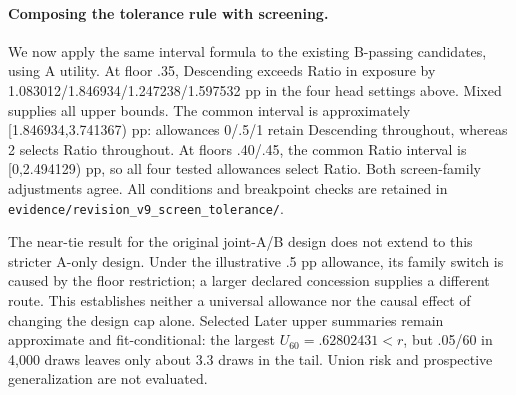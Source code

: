 

\paragraph{Composing the tolerance rule with screening.}
We now apply the same interval formula to the existing B-passing candidates, using A utility. At floor .35, Descending exceeds Ratio in exposure by 1.083012/1.846934/1.247238/1.597532 pp in the four head settings above. Mixed supplies all upper bounds. The common interval is approximately [1.846934,3.741367) pp: allowances 0/.5/1 retain Descending throughout, whereas 2 selects Ratio throughout. At floors .40/.45, the common Ratio interval is [0,2.494129) pp, so all four tested allowances select Ratio. Both screen-family adjustments agree. All conditions and breakpoint checks are retained in \texttt{evidence/revision\_v9\_screen\_tolerance/}.

The near-tie result for the original joint-A/B design does not extend to this stricter A-only design. Under the illustrative .5 pp allowance, its family switch is caused by the floor restriction; a larger declared concession supplies a different route. This establishes neither a universal allowance nor the causal effect of changing the design cap alone. Selected Later upper summaries remain approximate and fit-conditional: the largest $U_{60}=.62802431<r$, but .05/60 in 4,000 draws leaves only about 3.3 draws in the tail. Union risk and prospective generalization are not evaluated.
